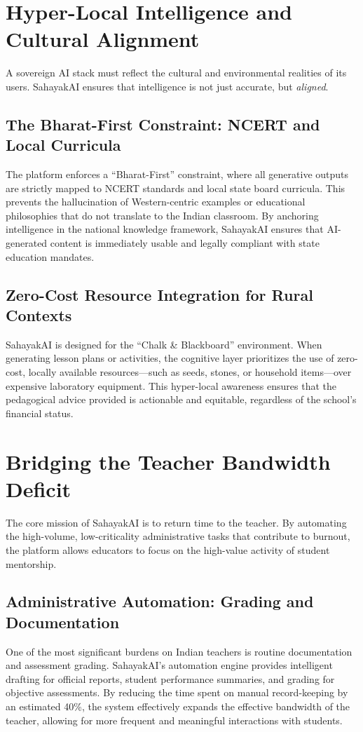\documentclass[11pt,a4paper]{article}
\begin{document}
\section{Hyper-Local Intelligence and Cultural Alignment}
A sovereign AI stack must reflect the cultural and environmental realities of its users. SahayakAI ensures that intelligence is not just accurate, but \textit{aligned}.

\subsection{The Bharat-First Constraint: NCERT and Local Curricula}
The platform enforces a ``Bharat-First'' constraint, where all generative outputs are strictly mapped to NCERT standards and local state board curricula. This prevents the hallucination of Western-centric examples or educational philosophies that do not translate to the Indian classroom. By anchoring intelligence in the national knowledge framework, SahayakAI ensures that AI-generated content is immediately usable and legally compliant with state education mandates.

\subsection{Zero-Cost Resource Integration for Rural Contexts}
SahayakAI is designed for the ``Chalk \& Blackboard'' environment. When generating lesson plans or activities, the cognitive layer prioritizes the use of zero-cost, locally available resources---such as seeds, stones, or household items---over expensive laboratory equipment. This hyper-local awareness ensures that the pedagogical advice provided is actionable and equitable, regardless of the school's financial status.

\section{Bridging the Teacher Bandwidth Deficit}
The core mission of SahayakAI is to return time to the teacher. By automating the high-volume, low-criticality administrative tasks that contribute to burnout, the platform allows educators to focus on the high-value activity of student mentorship.

\subsection{Administrative Automation: Grading and Documentation}
One of the most significant burdens on Indian teachers is routine documentation and assessment grading. SahayakAI's automation engine provides intelligent drafting for official reports, student performance summaries, and grading for objective assessments. By reducing the time spent on manual record-keeping by an estimated 40\%, the system effectively expands the effective bandwidth of the teacher, allowing for more frequent and meaningful interactions with students.
\end{document}
